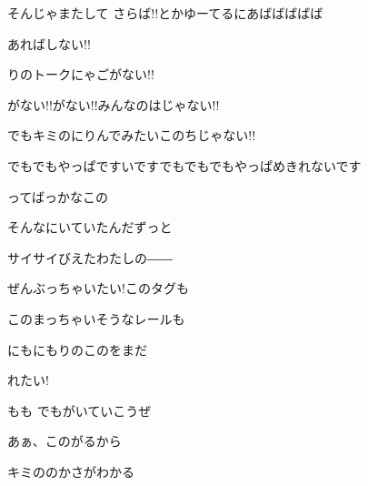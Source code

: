 \documentclass[a4paper,tate,twocolumn,12pt]{ltjtarticle}
\begin{document}
\begin{flushleft}
\begin{minipage}{\linewidth}
そんじゃまたして さらば!!とかゆーてるにあばばばばば
\end{minipage}

\vspace{2em}

\noindent\begin{minipage}{\linewidth}
あればしない!!

りのトークにゃごがない!!

がない!!がない!!みんなのはじゃない!!

でもキミのにりんでみたいこのちじゃない!!

でもでもやっぱですいですでもでもでもやっぱめきれないです
\end{minipage}

\vspace{2em}

\noindent\begin{minipage}{\linewidth}
ってばっかなこの

そんなにいていたんだずっと

サイサイびえたわたしの――
\end{minipage}

\vspace{2em}

\noindent\begin{minipage}{\linewidth}
ぜんぶっちゃいたい!このタグも

このまっちゃいそうなレールも

にもにもりのこのをまだ

れたい!

もも でもがいていこうぜ

あぁ、このがるから

キミののかさがわかる
\end{minipage}


\end{flushleft}
\end{document}
